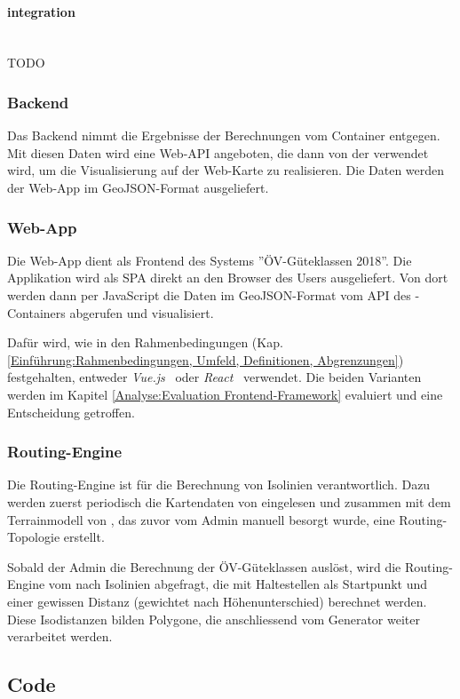 \paragraph{integration}~\\
TODO

\subsubsection{Backend}
\label{container:Backend}

Das Backend nimmt die Ergebnisse der Berechnungen vom Container  entgegen.
Mit diesen Daten wird eine Web-\ac{API} angeboten, die dann von der  verwendet wird, um die Visualisierung auf der Web-Karte zu realisieren.
Die Daten werden der Web-App im \gls{GeoJSON}-Format ausgeliefert.


\subsubsection{Web-App}
\label{container:Web-App}

Die Web-App dient als Frontend des Systems ''\acs{ÖV}-Güteklassen 2018''.
Die Applikation wird als \ac{SPA} direkt an den Browser des Users ausgeliefert.
Von dort werden dann per JavaScript die Daten im \gls{GeoJSON}-Format vom \ac{API} des -Containers abgerufen und visualisiert.

Dafür wird, wie in den Rahmenbedingungen (Kap. \ref{Einführung:Rahmenbedingungen, Umfeld, Definitionen, Abgrenzungen}) festgehalten, entweder \emph{Vue.js}~\cite{vuejs} oder \emph{React}~\cite{react} verwendet.
Die beiden Varianten werden im Kapitel \ref{Analyse:Evaluation Frontend-Framework} evaluiert und eine Entscheidung getroffen.

\subsubsection{Routing-Engine}
\label{container:Routing-Engine}

Die Routing-Engine ist für die Berechnung von Isolinien verantwortlich.
Dazu werden zuerst periodisch die Kartendaten von  eingelesen und zusammen mit dem \gls{Terrainmodell} von , das zuvor vom Admin manuell besorgt wurde, eine Routing-Topologie erstellt.

Sobald der Admin die Berechnung der ÖV-Güteklassen auslöst, wird die Routing-Engine vom  nach Isolinien abgefragt, die mit Haltestellen als Startpunkt und einer gewissen Distanz (gewichtet nach Höhenunterschied) berechnet werden.
Diese Isodistanzen bilden Polygone, die anschliessend vom Generator weiter verarbeitet werden.


\subsection{Code}
\label{Architektur:Code}

